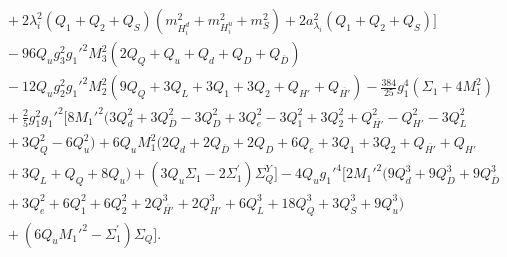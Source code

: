 \documentclass[preprint,amsmath,amssymb,aps,superscriptaddress,prd,showpacs,floatfix,nofootinbib]{revtex4-1}
\begin{document}
\begin{subequations}
\begin{align}
&{}+2\lambda_i^2\left ( Q_1+Q_2+Q_S\right )\left ( m_{H_i^d}^2+m_{H_i^u}^2+m_S^2\right )+2a_{\lambda_i}^2\left ( Q_1+Q_2+Q_S\right )\bigg ]\nonumber\\
&{}-96Q_ug_3^2g_1'^2M_3^2\left ( 2Q_Q+Q_u+Q_d+Q_D+Q_{\overline{D}}\right )\nonumber\\
&{}-12Q_ug_2^2g_1'^2M_2^2\left ( 9Q_Q+3Q_L+3Q_1+3Q_2+Q_{H'}+Q_{\overline{H'}}\right )-\frac{384}{25}g_1^4\left ( \Sigma_1+4M_1^2\right )\nonumber\\
&{}+\frac{2}{5}g_1^2g_1'^2\big [ 8M_1'^2 ( 3Q_d^2+3Q_{\overline{D}}^2-3Q_D^2+3Q_e^2-3Q_1^2+3Q_2^2+Q_{\overline{H'}}^2-Q_{H'}^2-3Q_L^2\nonumber\\
&{}+3Q_Q^2-6Q_u^2 )+6Q_uM_1^2 ( 2Q_d+2Q_{\overline{D}}+2Q_D+6Q_e+3Q_1+3Q_2+Q_{\overline{H'}}+Q_{H'}\nonumber\\
&{}+3Q_L+Q_Q+8Q_u )+\left ( 3Q_u\Sigma_1-2\Sigma_1^\prime\right ) \Sigma_Q^Y\big ]-4Q_ug_1'^4\big [ 2M_1'^2 ( 9Q_d^3+9Q_D^3+9Q_{\overline{D}}^3\nonumber\\
&{}+3Q_e^2+6Q_1^2+6Q_2^2+2Q_{\overline{H'}}^3+2Q_{H'}^3+6Q_L^3+18Q_Q^3+3Q_S^3+9Q_u^3 )\nonumber\\
&{}+\left(6Q_uM_1'^2-\Sigma_1^\prime\right )\Sigma_Q\big ].\label{eq:USSMmu222Ot2Coeff}
\end{align}
\end{subequations}

{}
\end{document}
